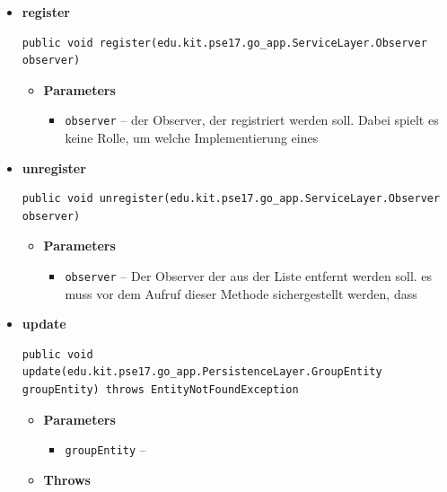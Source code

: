 \documentclass[11pt,a4paper]{article}
\begin{document}
{{{{{{{{{{{{{{\begin{itemize}
{\begin{itemize}
{}%
\end{itemize}
}%
\item{ 
\hypertarget{edu.kit.pse17.go_app.PersistenceLayer.daos.GroupDaoImp.register(edu.kit.pse17.go_app.ServiceLayer.Observer)}{{\bf  register}\\}
\begin{lstlisting}[frame=none]
public void register(edu.kit.pse17.go_app.ServiceLayer.Observer observer)\end{lstlisting} %
\begin{itemize}
\item{
{\bf  Parameters}
  \begin{itemize}
   \item{
\texttt{observer} -- der Observer, der registriert werden soll. Dabei spielt es keine Rolle, um welche Implementierung eines}
  \end{itemize}
}%
\end{itemize}
}%
\item{ 
\hypertarget{edu.kit.pse17.go_app.PersistenceLayer.daos.GroupDaoImp.unregister(edu.kit.pse17.go_app.ServiceLayer.Observer)}{{\bf  unregister}\\}
\begin{lstlisting}[frame=none]
public void unregister(edu.kit.pse17.go_app.ServiceLayer.Observer observer)\end{lstlisting} %
\begin{itemize}
\item{
{\bf  Parameters}
  \begin{itemize}
   \item{
\texttt{observer} -- Der Observer der aus der Liste entfernt werden soll. es muss vor dem Aufruf dieser Methode sichergestellt werden, dass}
  \end{itemize}
}%
\end{itemize}
}%
\item{ 
\hypertarget{edu.kit.pse17.go_app.PersistenceLayer.daos.GroupDaoImp.update(edu.kit.pse17.go_app.PersistenceLayer.GroupEntity)}{{\bf  update}\\}
\begin{lstlisting}[frame=none]
public void update(edu.kit.pse17.go_app.PersistenceLayer.GroupEntity groupEntity) throws EntityNotFoundException\end{lstlisting} %
\begin{itemize}
\item{
{\bf  Parameters}
  \begin{itemize}
   \item{
\texttt{groupEntity} -- }
  \end{itemize}
}%
\item{{\bf  Throws}
}%
\end{itemize}
}%
\end{itemize}
}
}
}}}}}}}}}}}}
\end{document}
